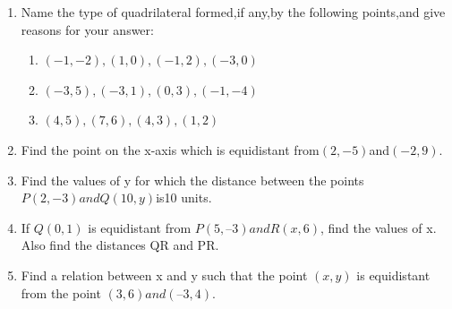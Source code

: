 \documentclass[12pt]{article}
\begin{document}
\begin{enumerate}
\item Name the type of quadrilateral formed,if any,by the following points,and give reasons for your answer:
\begin{enumerate}
\item $(-1,-2),(1,0),(-1,2),(-3,0)$
\item $(-3,5),(-3,1),(0,3),(-1,-4)$
\item $(4,5),(7,6),(4,3),(1,2)$
\end{enumerate}
\item Find the point on the x-axis which is equidistant from$(2,-5)$and$(-2,9)$.
\item Find the values of y for which the distance between the points                  $P(2,-3)and Q(10,y)$is10 units.
\item  If $Q(0, 1)$ is equidistant from $P(5, –3) and R(x, 6)$, find the values of x. Also find the
distances QR and PR.
\item  Find a relation between x and y such that the point $(x, y)$ is equidistant from the point
$(3, 6) and (– 3, 4)$.

\end{enumerate}
\end{document}
